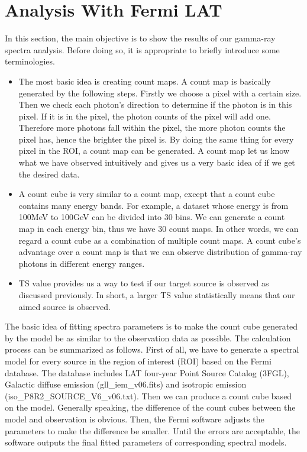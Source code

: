 \documentclass[12pt]{report}
\newcommand{\mayAdd}[1]{
  $<$\colorbox{red}{\textbf{mayAdd}}$>$#1$<$\colorbox{red}{\textbf{/mayAdd}}$>$
}
\begin{document}
        \section{Analysis With Fermi LAT}
          In this section, the main objective is to show the results of our gamma-ray spectra analysis. 
          Before doing so, it is appropriate to briefly introduce some terminologies. 
        \begin{itemize}
          \item The most basic idea is creating count maps. 
            A count map is basically generated by the following steps. Firstly we choose a 
            pixel with a certain size. Then we check each photon's direction to determine if the photon is in this 
            pixel. If it is in the pixel, the photon counts of the pixel will add one. Therefore more photons fall within 
            the pixel, the more photon counts the pixel has, hence the brighter the pixel is. By doing the same thing 
            for every pixel in the ROI, a count map can be generated. 
            A count map let us know what we have observed intuitively and 
            gives us a very basic idea of if we get the desired data. 
          \item A count cube is very similar to a count map, except that a count cube contains many energy
            bands. For example, a dataset whose energy is from 100MeV to 100GeV can be divided into 30 bins. We can
            generate a count map in each energy bin, thus we have 30 count maps. In other words, we can regard a 
            count cube as a combination of multiple count maps. A count cube's advantage over a count map is that we can 
            observe distribution of gamma-ray photons in different energy ranges. 
          \item TS value provides us a way to test if our target source is observed as discussed previously.
            In short, a larger TS value statistically means that our aimed source is observed. 
        \end{itemize}

        The basic idea of fitting spectra parameters is to make the count cube generated by the model be as similar 
        to the observation data as possible. The calculation process can be summarized as follows. First of all, we 
        have to generate a spectral model for every source in the region of interest (ROI) based on the Fermi database.
        The database includes LAT four-year Point Source Catalog (3FGL), Galactic diffuse emission (gll\_iem\_v06.fits)
        and isotropic emission (iso\_P8R2\_SOURCE\_V6\_v06.txt). 
        Then we can produce a count cube based on the model. Generally speaking, the difference of the 
        count cubes between the model and observation is obvious. Then, the Fermi software adjusts the parameters 
        to make the difference be smaller. Until the errors are acceptable, the software outputs the final fitted 
        parameters of corresponding spectral models.  
\end{document}
